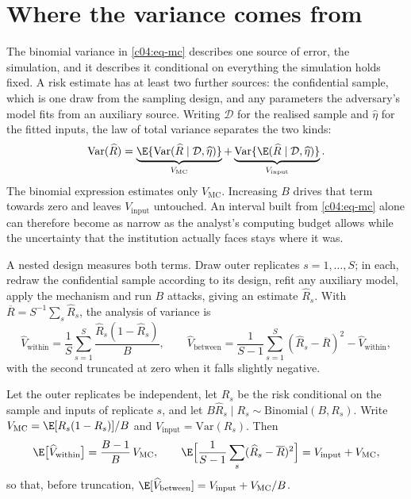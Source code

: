 \section{Where the variance comes from}\label{c04:sec-layers}

The binomial variance in \eqref{c04:eq-mc} describes one source of error, the
simulation, and it describes it conditional on everything the simulation holds fixed.
A risk estimate has at least two further sources: the confidential sample, which is one
draw from the sampling design, and any parameters the adversary's model fits from an
auxiliary source. Writing $\mathcal{D}$ for the realised sample and $\widehat\eta$ for
the fitted inputs, the law of total variance separates the two kinds:
\begin{equation}\label{c04:eq-total}
\mathrm{Var}(\widehat R)
= \underbrace{\E\{\mathrm{Var}(\widehat R \mid \mathcal{D},\widehat\eta)\}}_{V_{\mathrm{MC}}}
 + \underbrace{\mathrm{Var}\{\E(\widehat R \mid \mathcal{D},\widehat\eta)\}}_{V_{\mathrm{input}}}.
\end{equation}
The binomial expression estimates only $V_{\mathrm{MC}}$. Increasing $B$ drives that term
towards zero and leaves $V_{\mathrm{input}}$ untouched. An interval built from
\eqref{c04:eq-mc} alone can therefore become as narrow as the analyst's computing budget
allows while the uncertainty that the institution actually faces stays where it was.

A nested design measures both terms. Draw outer replicates $s = 1, \dots, S$; in each,
redraw the confidential sample according to its design, refit any auxiliary model, apply
the mechanism and run $B$ attacks, giving an estimate $\widehat R_s$. With
$\overline{R} = S^{-1}\sum_s\widehat R_s$, the analysis of variance is
\begin{equation}\label{c04:eq-nested}
\widehat V_{\mathrm{within}} = \frac{1}{S}\sum_{s=1}^{S}\frac{\widehat R_s(1-\widehat R_s)}{B},
\qquad
\widehat V_{\mathrm{between}} = \frac{1}{S-1}\sum_{s=1}^{S}(\widehat R_s - \overline R)^2
 - \widehat V_{\mathrm{within}},
\end{equation}
with the second truncated at zero when it falls slightly negative.

\begin{proposition}\label{c04:prop-nested}
Let the outer replicates be independent, let $R_s$ be the risk conditional on the
sample and inputs of replicate $s$, and let $B\widehat R_s \mid R_s \sim
\mathrm{Binomial}(B,R_s)$. Write $V_{\mathrm{MC}} = \E[R_s(1-R_s)]/B$ and
$V_{\mathrm{input}} = \mathrm{Var}(R_s)$. Then
\begin{equation}\label{c04:eq-nested-exp}
\E\big[\widehat V_{\mathrm{within}}\big] = \frac{B-1}{B}\,V_{\mathrm{MC}},
\qquad
\E\Big[\frac{1}{S-1}\sum_{s}(\widehat R_s-\overline R)^2\Big] = V_{\mathrm{input}} + V_{\mathrm{MC}},
\end{equation}
so that, before truncation, $\E[\widehat V_{\mathrm{between}}] = V_{\mathrm{input}} +
V_{\mathrm{MC}}/B$.
\end{proposition}

